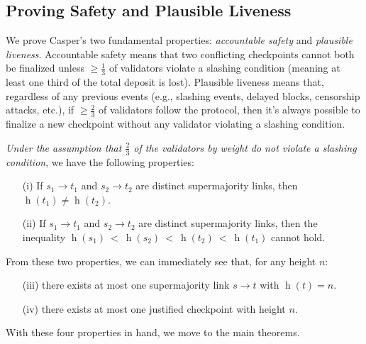 \documentclass[12pt]{article}
\newcommand{\h}{\operatorname{h}\xspace}
\begin{document}
\subsection{Proving Safety and Plausible Liveness}
\label{sect:theorems}

We prove Casper's two fundamental properties: \textit{accountable safety} and \textit{plausible liveness}. Accountable safety means that two conflicting checkpoints cannot both be finalized unless $\geq \frac{1}{3}$ of validators violate a slashing condition (meaning at least one third of the total deposit is lost).  Plausible liveness means that, regardless of any previous events (e.g., slashing events, delayed blocks, censorship attacks, etc.), if $\geq \frac{2}{3}$ of validators follow the protocol, then it's always possible to finalize a new checkpoint without any validator violating a slashing condition.

\emph{Under the assumption that $\frac{2}{3}$ of the validators by weight do not violate a slashing condition}, we have the following properties:

\begin{enumerate}
    \item[(i)] If $s_1 \rightarrow t_1$ and $s_2 \rightarrow t_2$ are distinct supermajority links, then $\h(t_1) \not= \h(t_2)$.
    \item[(ii)] If $s_1 \rightarrow t_1$ and $s_2 \rightarrow t_2$ are distinct supermajority links, then the inequality $\h(s_1)~<~\h(s_2)~<~\h(t_2)~<~\h(t_1)$ cannot hold.
\end{enumerate}

From these two properties, we can immediately see that, for any height $n$: 
\begin{enumerate}
\item[(iii)] there exists at most one supermajority link $s \to t$ with $\h(t) = n$.
\item[(iv)] there exists at most one justified checkpoint with height $n$.  
\end{enumerate}

With these four properties in hand, we move to the main theorems.
\end{document}
